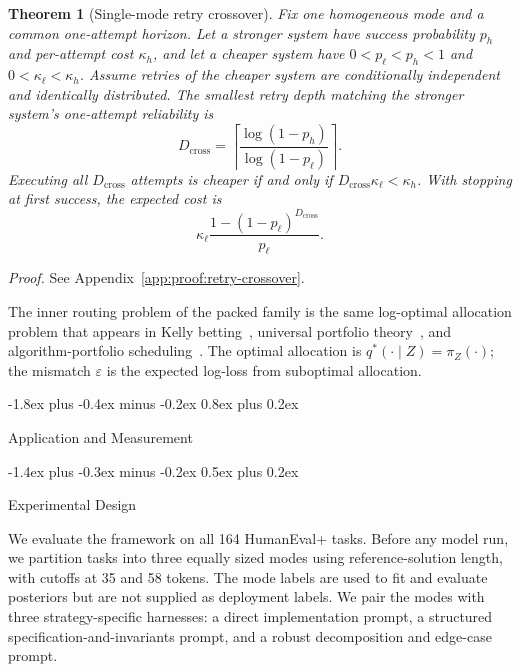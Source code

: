 \documentclass[10pt,twocolumn]{article}
\makeatletter
\theoremstyle{paperplain}
\newtheorem{theorem}{Theorem}[section]
\theoremstyle{paperdefinition}
\theoremstyle{paperremark}
\renewcommand{\section}{%
  \@startsection{section}{1}{\z@}%
    {-1.8ex plus -0.4ex minus -0.2ex}%
    {0.8ex plus 0.2ex}%
    {\normalfont\large\bfseries\raggedright}}
\renewcommand{\subsection}{%
  \@startsection{subsection}{2}{\z@}%
    {-1.4ex plus -0.3ex minus -0.2ex}%
    {0.5ex plus 0.2ex}%
    {\normalfont\normalsize\bfseries\raggedright}}
\makeatother
\begin{document}
\begin{theorem}[Single-mode retry crossover]
\label{thm:retry-crossover}
Fix one homogeneous mode and a common one-attempt horizon.  Let a stronger
system have success probability $p_h$ and per-attempt cost $\kappa_h$, and let
a cheaper system have $0<p_\ell<p_h<1$ and
$0<\kappa_\ell<\kappa_h$.  Assume retries of the cheaper system are
conditionally independent and identically distributed.  The smallest retry
depth matching the stronger system's one-attempt reliability is
\[
D_{\mathrm{cross}}
=
\left\lceil
\frac{\log(1-p_h)}{\log(1-p_\ell)}
\right\rceil.
\]
Executing all $D_{\mathrm{cross}}$ attempts is cheaper if and only if
$D_{\mathrm{cross}}\kappa_\ell<\kappa_h$.  With stopping at first success,
the expected cost is
\[
\kappa_\ell
\frac{1-(1-p_\ell)^{D_{\mathrm{cross}}}}{p_\ell}.
\]
\end{theorem}

\par\noindent\emph{Proof.} See Appendix~\ref{app:proof:retry-crossover}.\par

The inner routing problem of the packed family is the same log-optimal allocation problem that appears in Kelly betting~\cite{kelly1956}, universal portfolio theory~\cite{cover-thomas2006}, and algorithm-portfolio scheduling~\cite{gomes-selman2001}. The optimal allocation is $q^*(\cdot \mid Z)=\pi_Z(\cdot)$; the mismatch $\varepsilon$ is the expected log-loss from suboptimal allocation.

\section{Application and Measurement}
\label{sec:application}
\label{sec:measurement}

\subsection{Experimental Design}

We evaluate the framework on all 164 HumanEval+ tasks.  Before any model run,
we partition tasks into three equally sized modes using reference-solution
length, with cutoffs at 35 and 58 tokens.  The mode labels are used to fit and
evaluate posteriors but are not supplied as deployment labels.  We pair the
modes with three strategy-specific harnesses: a direct implementation prompt,
a structured specification-and-invariants prompt, and a robust decomposition
and edge-case prompt.
\end{document}
